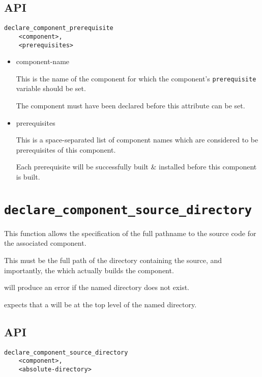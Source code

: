 \subsection{API}

\begin{verbatim}
declare_component_prerequisite
    <component>,
    <prerequisites>
\end{verbatim}

\begin{itemize}
\item component-name

  This is the name of the component for which the component's
  \texttt{prerequisite} variable should be set.

  The component must have been declared before this attribute can be
  set.

\item prerequisites

  This is a space-separated list of component names which are
  considered to be prerequisites of this component.

  Each prerequisite will be successfully built \& installed before
  this component is built.
\end{itemize}

\section{\texttt{declare\_component\_source\_directory}}\label{api:source-directory}

This function allows the specification of the full pathname to the
source code for the associated component.

This must be the full path of the directory containing the source, and
importantly, the \makefile which actually builds the component.

\lmsbw will produce an error if the named directory does not exist.

\lmsbw expects that a \makefile will be at the top level of the named
directory.

\subsection{API}

\begin{verbatim}
declare_component_source_directory
    <component>,
    <absolute-directory>
\end{verbatim}

